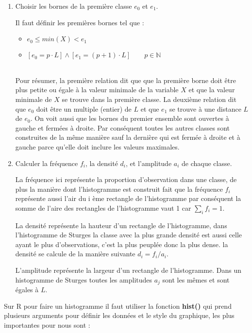 \documentclass{report}
\begin{document}
\begin{enumerate}
  \item Choisir les bornes de la première classe $e_0$ et $e_1$.
  
  Il faut définir les premières bornes tel que : \\
  
  \begin{itemize}
  \item $e_0\leq min(X) < e_1$ 
  \item $[e_0 = p \cdot L]\wedge[e_1 = (p+1)\cdot L] \qquad p\in\mathbb{N}$
\end{itemize}
\quad\\
Pour résumer, la première relation dit que que la première borne doit être plus petite ou égale à la valeur minimale de la variable $X$ et que la valeur minimale de $X$ se trouve dans la première classe. La deuxième relation dit que $e_0$ doit être un multiple (entier) de $L$ et que $e_1$ se trouve à une distance $L$ de $e_0$. On voit aussi que les bornes du premier ensemble sont ouvertes à gauche et fermées à droite. Par conséquent toutes les autres classes sont construites de la même manière sauf la dernière qui est fermée à droite et à gauche parce qu'elle doit inclure les valeurs maximales.
  
  \item Calculer la fréquence $f_i$, la densité $d_i$, et l'amplitude $a_i$ de chaque classe. 
  
  La fréquence ici représente la proportion d'observation dans une classe, de plus la manière dont l'histogramme est construit fait que la fréquence $f_i$ représente aussi l'air du i ème rectangle de l'histogramme par conséquent la somme de l'aire des rectangles de l'histogramme vaut 1 car $\sum_{i} f_i = 1$.
  
  La densité représente la hauteur d'un rectangle de l'histogramme, dans l'histogramme de Sturges la classe avec la plus grande densité est aussi celle ayant le plus d'observations, c'est la plus peuplée donc la plus dense. la densité se calcule de la manière suivante $d_i = f_i/a_i$.
  
  L'amplitude représente la largeur d'un rectangle de l'histogramme. Dans un histogramme de Sturges toutes les amplitudes $a_j$ sont les mêmes et sont égales à $L$.
\end{enumerate}

Sur R pour faire un histogramme il faut utiliser la fonction \textbf{hist()} qui prend plusieurs arguments pour définir les données et le style du graphique, les plus importantes pour nous sont :
\end{document}
